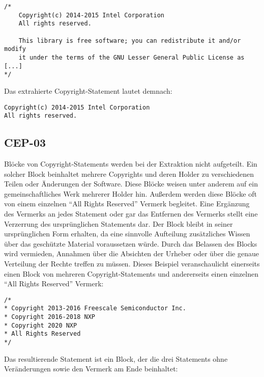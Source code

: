 \begin{lstlisting}[keepspaces=true]
/*
    Copyright(c) 2014-2015 Intel Corporation
    All rights reserved.

    This library is free software; you can redistribute it and/or modify
    it under the terms of the GNU Lesser General Public License as [...]
*/
\end{lstlisting}

Das extrahierte Copyright-Statement lautet demnach:

\begin{lstlisting}[keepspaces=true]
Copyright(c) 2014-2015 Intel Corporation
All rights reserved.
\end{lstlisting}


\subsection{CEP-03}\label{subsec:cep-03}

Blöcke von Copyright-Statements werden bei der Extraktion nicht aufgeteilt.
Ein solcher Block beinhaltet mehrere Copyrights und deren Holder zu verschiedenen Teilen oder Änderungen der Software.
Diese Blöcke weisen unter anderem auf ein gemeinschaftliches Werk mehrerer Holder hin.
Außerdem werden diese Blöcke oft von einem einzelnen \enquote{All Rights Reserved} Vermerk begleitet.
Eine Ergänzung des Vermerks an jedes Statement oder gar das Entfernen des Vermerks stellt eine Verzerrung des ursprünglichen Statements dar.
Der Block bleibt in seiner ursprünglichen Form erhalten, da eine sinnvolle Aufteilung zusätzliches Wissen über das geschützte Material voraussetzen würde.
Durch das Belassen des Blocks wird vermieden, Annahmen über die Absichten der Urheber oder über die genaue Verteilung der Rechte treffen zu müssen.
Dieses Beispiel veranschaulicht einerseits einen Block von mehreren Copyright-Statements und andererseits einen einzelnen \enquote{All Rights Reserved} Vermerk:

\begin{lstlisting}[keepspaces=true]
/*
* Copyright 2013-2016 Freescale Semiconductor Inc.
* Copyright 2016-2018 NXP
* Copyright 2020 NXP
* All Rights Reserved
*/
\end{lstlisting}

Das resultierende Statement ist ein Block, der die drei Statements ohne Veränderungen sowie den Vermerk am Ende beinhaltet:

